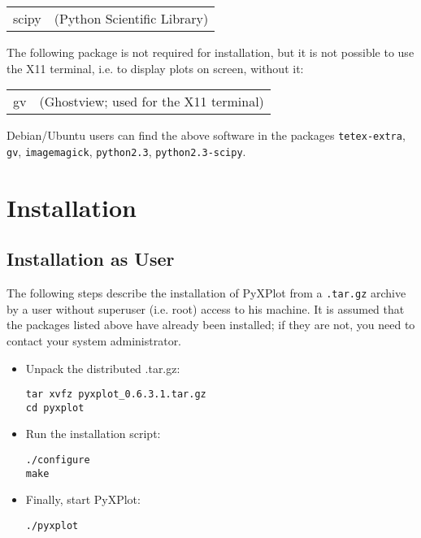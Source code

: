 \documentclass[a4paper,onecolumn,11pt]{book}
\begin{document}
\vspace{0.5cm}
\begin{tabular}{ll} 
scipy   & (Python Scientific Library) \\
\end{tabular}
\vspace{0.5cm}

The following package is not required for installation, but it is not possible
to use the X11 terminal, i.e. to display plots on screen, without it:

\vspace{0.5cm}
\begin{tabular}{ll}
gv      & (Ghostview; used for the X11 terminal) \\
\end{tabular}
\vspace{0.5cm}

Debian/Ubuntu users can find the above software in the packages \texttt{tetex-extra},
\texttt{gv}, \texttt{imagemagick}, \texttt{python2.3},
\texttt{python2.3-scipy}.

\section{Installation}

\subsection{Installation as User}

The following steps describe the installation of PyXPlot from a
\texttt{.tar.gz} archive by a user without superuser (i.e. root) access to his
machine. It is assumed that the packages listed above have already been
installed; if they are not, you need to contact your system administrator.

\begin{itemize}
\item Unpack the distributed .tar.gz:

\begin{verbatim}
tar xvfz pyxplot_0.6.3.1.tar.gz
cd pyxplot
\end{verbatim}

\item Run the installation script:

\begin{verbatim}
./configure
make
\end{verbatim}

\item Finally, start PyXPlot:

\begin{verbatim}
./pyxplot
\end{verbatim}

\end{itemize}
\end{document}
